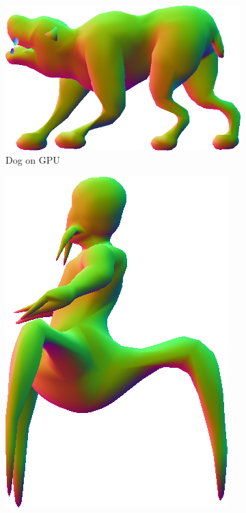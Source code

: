 \begin{figure}
	\begin{subfigure}[b]{0.2\textwidth}
		\centering
		\includegraphics[width=\textwidth]{content/img/results/doggpu.png}
		\caption{Dog on GPU}
		\label{fig:results:cpugpu:gpuDog}
	\end{subfigure}
	\hspace{0.1\textwidth}
	\begin{subfigure}[b]{0.2\textwidth}
		\centering
		\includegraphics[width=\textwidth]{content/img/results/voregpu.png}

\end{subfigure}
\end{figure}
